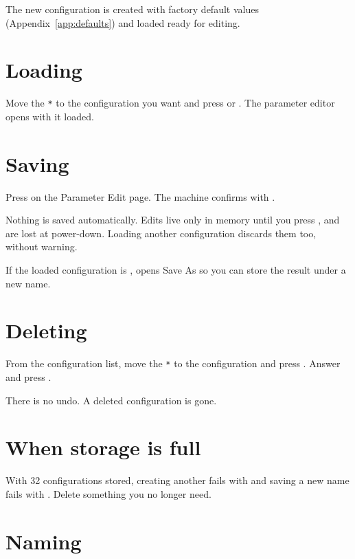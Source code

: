 The new configuration is created with factory default values
(Appendix~\ref{app:defaults}) and loaded ready for editing.

\section{Loading}

Move the \texttt{*} to the configuration you want and press  or
. The parameter editor opens with it loaded.

\section{Saving}

Press  on the Parameter Edit page. The machine confirms with
.

\begin{wbwarning}
Nothing is saved automatically. Edits live only in memory until you press
, and are lost at power-down. Loading another configuration
discards them too, without warning.
\end{wbwarning}

If the loaded configuration is ,  opens Save As
so you can store the result under a new name.

\section{Deleting}

From the configuration list, move the \texttt{*} to the configuration and press
. Answer  and press .

\begin{wbwarning}
There is no undo. A deleted configuration is gone.
\end{wbwarning}

\section{When storage is full}

With 32 configurations stored, creating another fails with  and
saving a new name fails with . Delete something you no longer
need.

\section{Naming}

